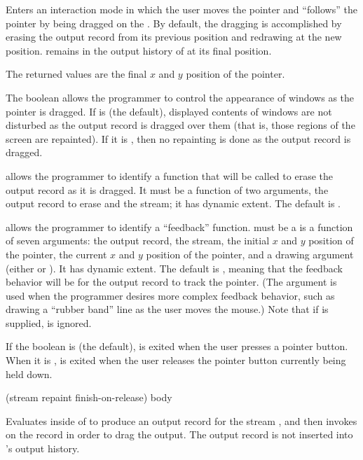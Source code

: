 Enters an interaction mode in which the user moves the pointer and
 ``follows'' the pointer by being dragged on the  .  By default, the dragging is accomplished by
erasing the output record from its previous position and redrawing at the new
position.   remains in the output history of  at
its final position.

The returned values are the final $x$ and $y$ position of the pointer.

The boolean  allows the programmer to control the appearance of
windows as the pointer is dragged.  If  is  (the
default), displayed contents of windows are not disturbed as the output record
is dragged over them (that is, those regions of the screen are repainted).  If
it is , then no repainting is done as the output record is dragged.

 allows the programmer to identify a function that will be called to
erase the output record as it is dragged.  It must be a function of two
arguments, the output record to erase and the stream; it has dynamic extent.
The default is .

 allows the programmer to identify a ``feedback'' function.
 must be a is a function of seven arguments: the output record,
the stream, the initial $x$ and $y$ position of the pointer, the current $x$ and
$y$ position of the pointer, and a drawing argument (either  or
).  It has dynamic extent.  The default is , meaning that the
feedback behavior will be for the output record to track the pointer.  (The
 argument is used when the programmer desires more complex
feedback behavior, such as drawing a ``rubber band'' line as the user moves the
mouse.)  Note that if  is supplied,  is ignored.

If the boolean  is  (the default),
 is exited when the user presses a pointer button.  When
it is ,  is exited when the user releases the
pointer button currently being held down.

 {(\optional stream \key repaint finish-on-release)
                             \body body}

Evaluates  inside of  to produce an
output record for the stream , and then invokes
 on the record in order to drag the output.  The output
record is not inserted into 's output history.

